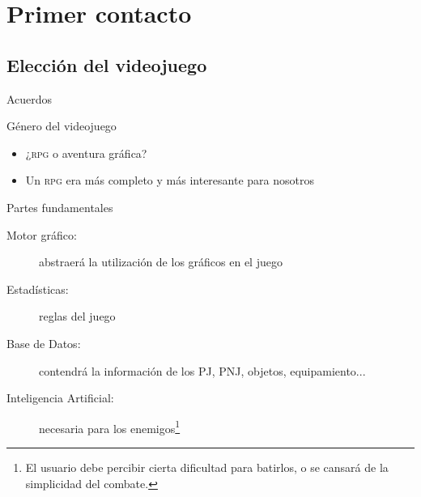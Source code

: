 \documentclass[9pt,xcolor=svgnames]{beamer}
\begin{document}
  
 \section{Primer contacto}
 
  \subsection{Elección del videojuego}
  
  \begin{frame}{Acuerdos}
   \transdissolve
   
   \begin{block}{Género del videojuego}
    \begin{itemize}
     \item ¿\textsc{rpg} o aventura gráfica?
     \item Un \textsc{rpg} era más completo y más interesante para
	   nosotros
    \end{itemize}
   \end{block}
   
   \begin{block}{Partes fundamentales}   
    \begin{description}
     \item[Motor gráfico: ] abstraerá la utilización de los gráficos en
		el juego
     \item[Estadísticas: ] reglas del juego
     \item[Base de Datos: ] contendrá la información de los PJ, PNJ,
		objetos, equipamiento...
     \item[Inteligencia Artificial: ] necesaria para los
		enemigos\footnote{El usuario debe percibir cierta
		dificultad para batirlos, o se cansará de la simplicidad
		del combate.}
    \end{description}
   \end{block}
  \end{frame}
  
\end{document}
